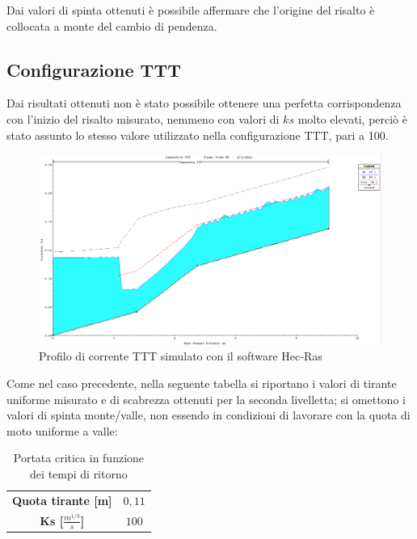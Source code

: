 \documentclass[12pt]{article} %
\begin{document}
\noindent Dai valori di spinta ottenuti è possibile affermare che l'origine del risalto è collocata a monte del cambio di pendenza.

\newpage
\subsection{Configurazione TTT}

\noindent  Dai risultati ottenuti non è stato possibile ottenere una perfetta corrispondenza con l’inizio del risalto misurato, nemmeno con valori di $ks$ molto elevati, perciò è stato assunto lo stesso valore utilizzato nella configurazione TTT, pari a 100. 

\begin{figure}[H]
    \centering
    \includegraphics[scale=0.35]{Profilo HEC-RAS TTT 2.png}
    \caption{Profilo di corrente TTT simulato con il software Hec-Ras}

\end{figure}

\noindent Come nel caso precedente, nella seguente tabella si riportano i valori di tirante uniforme misurato e di scabrezza ottenuti per la seconda livelletta; si omettono i valori di spinta monte/valle, non essendo in condizioni di lavorare con la quota di moto uniforme a valle:

\begin{table}[H]
    \centering
    \begin{tabular}{|c|c|}
        \hline
        \textbf{Quota tirante [m]} & $0,11$ \\
        \textbf{Ks [$\frac{m^{1/3}}{s}$]} & $100$\\
        \hline
    \end{tabular}
    \caption{Portata critica in funzione dei tempi di ritorno}
\end{table}
\end{document}

